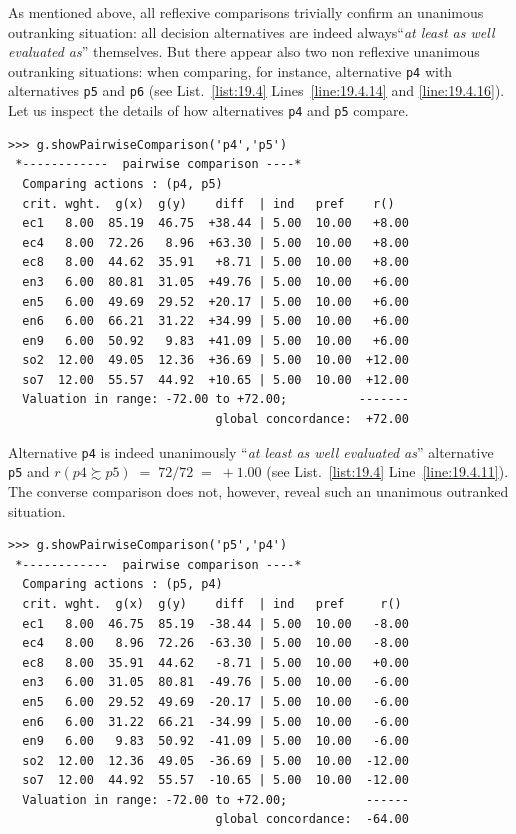 As mentioned above, all reflexive comparisons trivially confirm an unanimous outranking situation: all decision alternatives are indeed always``\emph{at least as well evaluated as}'' themselves. But there appear also two non reflexive unanimous outranking situations: when comparing, for instance, alternative \texttt{p4} with alternatives \texttt{p5} and \texttt{p6} (see List.~\vref{list:19.4} Lines~\ref{line:19.4.14} and \ref{line:19.4.16}). Let us inspect the details of how alternatives \texttt{p4} and \texttt{p5} compare.
\begin{lstlisting}
>>> g.showPairwiseComparison('p4','p5')
 *------------  pairwise comparison ----*
  Comparing actions : (p4, p5)
  crit. wght.  g(x)  g(y)    diff  | ind   pref    r()
  ec1   8.00  85.19  46.75  +38.44 | 5.00  10.00   +8.00
  ec4   8.00  72.26   8.96  +63.30 | 5.00  10.00   +8.00
  ec8   8.00  44.62  35.91   +8.71 | 5.00  10.00   +8.00
  en3   6.00  80.81  31.05  +49.76 | 5.00  10.00   +6.00
  en5   6.00  49.69  29.52  +20.17 | 5.00  10.00   +6.00
  en6   6.00  66.21  31.22  +34.99 | 5.00  10.00   +6.00
  en9   6.00  50.92   9.83  +41.09 | 5.00  10.00   +6.00
  so2  12.00  49.05  12.36  +36.69 | 5.00  10.00  +12.00
  so7  12.00  55.57  44.92  +10.65 | 5.00  10.00  +12.00
  Valuation in range: -72.00 to +72.00;          -------
                             global concordance:  +72.00
\end{lstlisting}

Alternative \texttt{p4} is indeed  unanimously ``\emph{at least as well evaluated as}'' alternative \texttt{p5} and $r(p4 \succsim p5)\; =\; 72/72\; =\; +1.00$ (see List.~\vref{list:19.4} Line~\ref{line:19.4.11}). The converse comparison does not, however, reveal such an unanimous outranked situation. 
\begin{lstlisting}
>>> g.showPairwiseComparison('p5','p4')
 *------------  pairwise comparison ----*
  Comparing actions : (p5, p4)
  crit. wght.  g(x)  g(y)    diff  | ind   pref     r()
  ec1   8.00  46.75  85.19  -38.44 | 5.00  10.00   -8.00
  ec4   8.00   8.96  72.26  -63.30 | 5.00  10.00   -8.00
  ec8   8.00  35.91  44.62   -8.71 | 5.00  10.00   +0.00 
  en3   6.00  31.05  80.81  -49.76 | 5.00  10.00   -6.00
  en5   6.00  29.52  49.69  -20.17 | 5.00  10.00   -6.00
  en6   6.00  31.22  66.21  -34.99 | 5.00  10.00   -6.00
  en9   6.00   9.83  50.92  -41.09 | 5.00  10.00   -6.00
  so2  12.00  12.36  49.05  -36.69 | 5.00  10.00  -12.00
  so7  12.00  44.92  55.57  -10.65 | 5.00  10.00  -12.00
  Valuation in range: -72.00 to +72.00;           ------
                             global concordance:  -64.00
\end{lstlisting}

